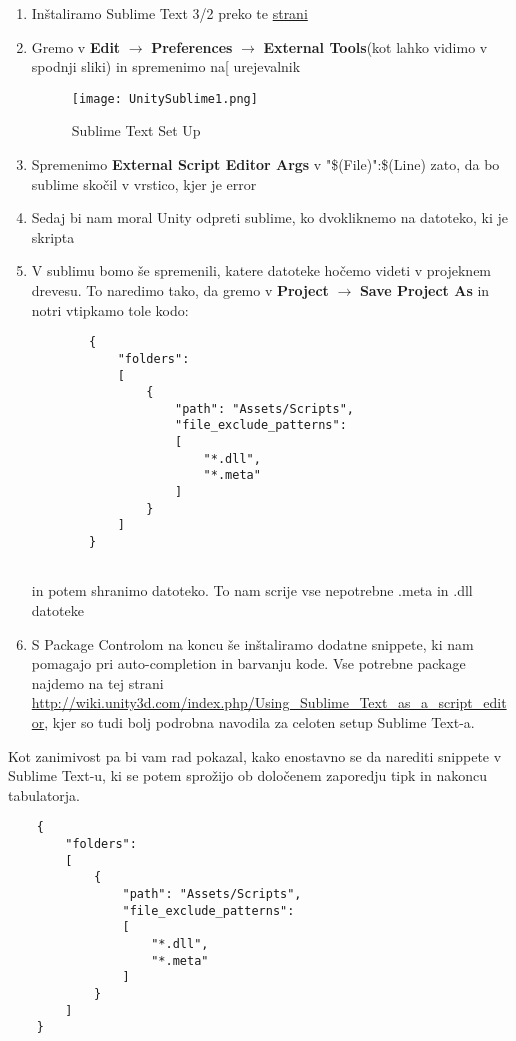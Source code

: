 \begin{enumerate}
	\item Inštaliramo Sublime Text 3/2 preko te \href{http://www.sublimetext.com/3}{strani}
	\item Gremo v \textbf{Edit} $\rightarrow$ \textbf{Preferences} $\rightarrow$ \textbf{External Tools}(kot lahko vidimo v spodnji sliki) in spremenimo na[ urejevalnik\\
	\begin{figure}[h]
  		\centering
		\texttt{[image: UnitySublime1.png]}
		\caption{Sublime Text Set Up}
	\end{figure}
	\item Spremenimo \textbf{External Script Editor Args} v "\$(File)":\$(Line) zato, da bo sublime skočil v vrstico, kjer je error 
	\item Sedaj bi nam moral Unity odpreti sublime, ko dvokliknemo na datoteko, ki je skripta
	\item V sublimu bomo še spremenili, katere datoteke hočemo videti v projeknem drevesu. To naredimo tako, da gremo v \textbf{Project} $\rightarrow$ \textbf{Save Project As} in notri vtipkamo tole kodo:\\
	\begin{verbatim}
		{
			"folders":
			[
				{
					"path": "Assets/Scripts",
					"file_exclude_patterns":
					[
						"*.dll",
						"*.meta"
					]
				}
			]
		}
		
	\end{verbatim}
	in potem shranimo datoteko. To nam scrije vse nepotrebne .meta in .dll datoteke
	\item S Package Controlom na koncu še inštaliramo dodatne snippete, ki nam pomagajo pri auto-completion in barvanju kode. Vse potrebne package najdemo na tej strani \url{http://wiki.unity3d.com/index.php/Using_Sublime_Text_as_a_script_editor}, kjer so tudi bolj podrobna navodila za celoten setup Sublime Text-a.
\end{enumerate}
Kot zanimivost pa bi vam rad pokazal, kako enostavno se da narediti snippete v Sublime Text-u, ki se potem sprožijo ob določenem zaporedju tipk in nakoncu tabulatorja. 
\begin{verbatim}
	{
		"folders":
		[
			{
				"path": "Assets/Scripts",
				"file_exclude_patterns":
				[
					"*.dll",
					"*.meta"
				]
			}
		]
	}
	
\end{verbatim}